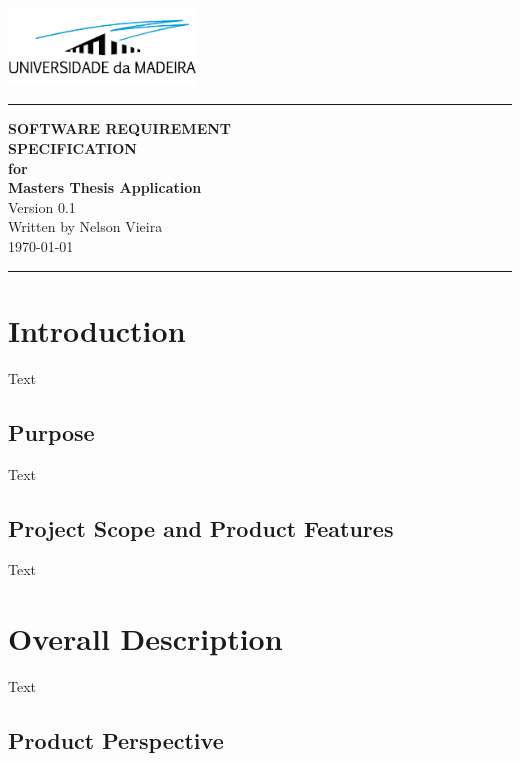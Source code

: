 \documentclass{scrreprt}
\date{}
\begin{document}
\begin{flushright}
    \includegraphics[width=5cm]{../../thesis/assets/images/uma_logo.png}
    \rule{16cm}{5pt}\vskip1cm
    \Huge{\textbf{\uppercase{Software Requirement}} \\ \textbf{\uppercase{Specification}}} \\
    \vspace{1cm}
    \textbf{for} \\
    \vspace{1cm}
    \textbf{Masters Thesis Application} \\
    \vspace{2cm}
    \LARGE{Version 0.1 \\}
    \vspace{2cm}
    Written by Nelson Vieira \\
    \vspace{2cm}
    \today
    \vfill
    \rule{16cm}{5pt}
\end{flushright}

\tableofcontents

\chapter{Introduction}

Text

\section{Purpose}

Text

\section{Project Scope and Product Features}

Text

\chapter{Overall Description}

Text

\section{Product Perspective}
\end{document}
